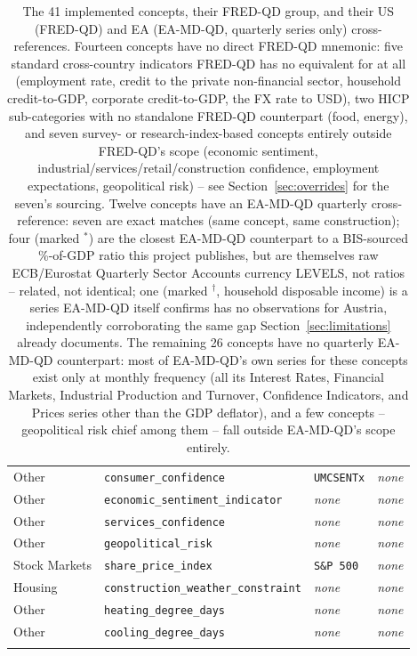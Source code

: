 \documentclass[11pt]{article}
\begin{document}
\begin{longtable}{L{4cm} L{4cm} L{2.8cm} L{2.5cm}}
Other & \texttt{consumer\_\allowbreak{}confidence} & \texttt{UMCSENTx} & \emph{none} \\
Other & \texttt{economic\_\allowbreak{}sentiment\_\allowbreak{}indicator} & \emph{none} & \emph{none} \\
Other & \texttt{services\_\allowbreak{}confidence} & \emph{none} & \emph{none} \\
Other & \texttt{geopolitical\_\allowbreak{}risk} & \emph{none} & \emph{none} \\
Stock Markets & \texttt{share\_\allowbreak{}price\_\allowbreak{}index} & \texttt{S\&P 500} & \emph{none} \\
Housing & \texttt{construction\_\allowbreak{}weather\_\allowbreak{}constraint} & \emph{none} & \emph{none} \\
Other & \texttt{heating\_\allowbreak{}degree\_\allowbreak{}days} & \emph{none} & \emph{none} \\
Other & \texttt{cooling\_\allowbreak{}degree\_\allowbreak{}days} & \emph{none} & \emph{none} \\
\bottomrule
\caption{The 41 implemented concepts, their FRED-QD group, and their US
(FRED-QD) and EA (EA-MD-QD, quarterly series only) cross-references.
Fourteen concepts have no direct FRED-QD mnemonic: five standard
cross-country indicators FRED-QD has no equivalent for at all (employment
rate, credit to the private non-financial sector, household credit-to-GDP,
corporate credit-to-GDP, the FX rate to USD), two HICP sub-categories with
no standalone FRED-QD counterpart (food, energy), and seven survey- or
research-index-based concepts entirely outside FRED-QD's scope (economic
sentiment, industrial/services/retail/construction confidence, employment
expectations, geopolitical risk) -- see Section~\ref{sec:overrides} for
the seven's sourcing. Twelve concepts have an EA-MD-QD quarterly
cross-reference: seven are exact matches (same concept, same construction);
four (marked $^{*}$) are the closest EA-MD-QD counterpart to a BIS-sourced
\%-of-GDP ratio this project publishes, but are themselves raw
ECB/Eurostat Quarterly Sector Accounts currency LEVELS, not ratios --
related, not identical; one (marked $^{\dagger}$, household disposable
income) is a series EA-MD-QD itself confirms has no observations for
Austria, independently corroborating the same gap Section~\ref{sec:limitations}
already documents. The remaining 26 concepts have no quarterly EA-MD-QD
counterpart: most of EA-MD-QD's own series for these concepts exist only
at monthly frequency (all its Interest Rates, Financial Markets,
Industrial Production and Turnover, Confidence Indicators, and Prices
series other than the GDP deflator), and a few concepts -- geopolitical
risk chief among them -- fall outside EA-MD-QD's scope entirely.}
\label{tab:groups}
\end{longtable}
\end{document}
